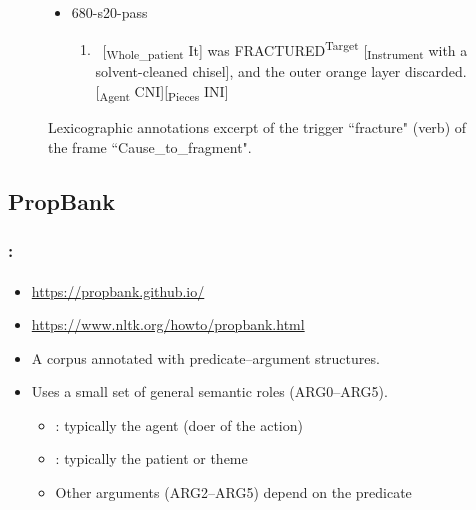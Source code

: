 \documentclass[xcolor=table]{beamer}
\begin{document}
\begin{frame}
\begin{figure}
\begin{tcolorbox}[colback=white, colframe=blue, boxrule=1pt, text width=.91\textwidth]
\begin{itemize}
			\item 680-s20-pass
			\begin{enumerate}\tiny
				\item \ [\textsubscript{\color{red}Whole\_patient} It] was FRACTURED\textsuperscript{\color{red}Target} [\textsubscript{\color{red}Instrument} with a solvent-cleaned chisel], and the outer orange layer discarded. [\textsubscript{\color{red}Agent} CNI][\textsubscript{\color{red}Pieces} INI] 
			\end{enumerate}
			
		\end{itemize}\vspace{-6pt}
	\end{tcolorbox}\vspace{-6pt}

		\caption{Lexicographic annotations excerpt of the trigger ``fracture" (verb) of the frame ``Cause\_to\_fragment".}
	\end{figure}
	
\end{frame}

\subsection{PropBank}

\begin{frame}
	\frametitle{\insertshortsubtitle: \insertsection}
	\framesubtitle{\insertsubsection}
	
	\begin{itemize}
		\item {\scriptsize \url{https://propbank.github.io/}}
		\item {\scriptsize \url{https://www.nltk.org/howto/propbank.html}}
		\item A corpus annotated with predicate--argument structures.
		\item Uses a small set of general semantic roles (ARG0--ARG5).
		\begin{itemize}
			\item {}: typically the agent (doer of the action)
			\item {}: typically the patient or theme
			\item Other arguments (ARG2--ARG5) depend on the predicate
		\end{itemize}
	\end{itemize}
	
\end{frame}
\end{document}
